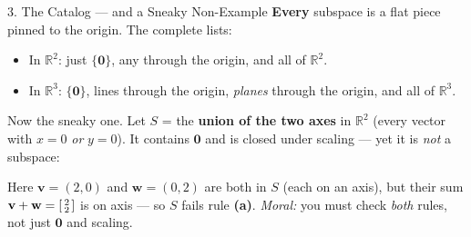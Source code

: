 \documentclass[10pt]{article}
\newcommand{\vv}{\mathbf{v}}
\newcommand{\ww}{\mathbf{w}}
\newcommand{\zero}{\mathbf{0}}
\begin{document}
\begin{notesbox}{3. The Catalog --- and a Sneaky Non-Example}
\textbf{Every} subspace is a flat piece pinned to the origin. The complete lists:
\begin{itemize}[leftmargin=1.5em, itemsep=1pt]
  \item In $\mathbb{R}^2$: just $\{\zero\}$, any  through the origin, and all of $\mathbb{R}^2$.
  \item In $\mathbb{R}^3$: $\{\zero\}$, lines through the origin, \emph{planes} through the origin, and all of $\mathbb{R}^3$.
\end{itemize}
Now the sneaky one. Let $S$ = the \textbf{union of the two axes} in $\mathbb{R}^2$ (every vector with
$x=0$ \emph{or} $y=0$). It contains $\zero$ and is closed under scaling --- yet it is \emph{not} a
subspace:
\begin{center}
\end{center}
Here $\vv=(2,0)$ and $\ww=(0,2)$ are both in $S$ (each on an axis), but their sum
$\vv+\ww=\begin{bsmallmatrix} 2\\2 \end{bsmallmatrix}$ is on  axis --- so $S$ fails rule
\textbf{(a)}. \emph{Moral:} you must check \emph{both} rules, not just $\zero$ and scaling.
\end{notesbox}
\end{document}
